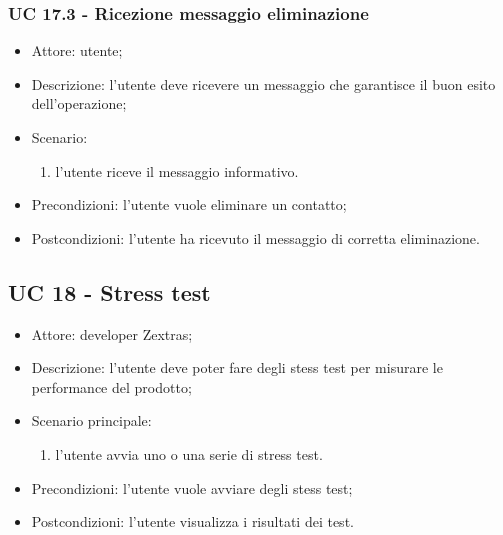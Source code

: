 \subsubsection{UC 17.3 - Ricezione messaggio eliminazione} \label{sec: UC 17.3}
\begin{itemize}
    \item Attore: utente;
    \item Descrizione: l'utente deve ricevere un messaggio che garantisce il buon esito dell'operazione;
    \item Scenario:
        \begin{enumerate}
        \item l'utente riceve il messaggio informativo.
        \end{enumerate}
    
    \item Precondizioni: l'utente vuole eliminare un contatto;
    \item Postcondizioni: l'utente ha ricevuto il messaggio di corretta eliminazione.
\end{itemize}


\subsection{UC 18 - Stress test}
\begin{itemize}
    \item Attore: developer Zextras;
    \item Descrizione: l'utente deve poter fare degli stess test per misurare le performance del prodotto;
    \item Scenario principale:
        \begin{enumerate}
        \item l'utente avvia uno o una serie di stress test. 
        \end{enumerate}
    \item Precondizioni: l'utente vuole avviare degli stess test;
    \item Postcondizioni: l'utente visualizza i risultati dei test.
\end{itemize}